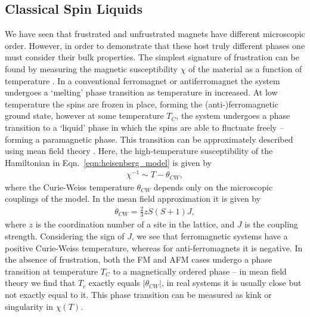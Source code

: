 
\subsection{Classical Spin Liquids} 

We have seen that frustrated and unfrustrated magnets have different microscopic order. However, in order to demonstrate that these host truly different phases one must consider their bulk properties. The simplest signature of frustration can be found by measuring the magnetic susceptibility $\chi$ of the material as a function of temperature \cite{ramirez_strongly_1994,mugiraneza_tutorial_2022}. In a conventional ferromagnet or antiferromagnet the system undergoes a `melting' phase transition as temperature in increased. At low temperature the spins are frozen in place, forming the (anti-)ferromagnetic ground state, however at some temperature $T_C$, the system undergoes a phase transition to a `liquid' phase in which the spins are able to fluctuate freely -- forming a paramagnetic phase. This transition can be approximately described using mean field theory \cite{simon_oxford_2013}. Here, the high-temperature susceptibility of the Hamiltonian in Eqn.~\ref{eqn:heisenberg_model} is given by
\begin{align}
    \chi^{-1} \sim T - \theta_{CW},
\end{align}
where the Curie-Weiss temperature $\theta_{CW}$ depends only on the microscopic couplings of the model. In the mean field approximation it is given by
\begin{align}
    \theta_{CW} = \frac 23 z S(S+1 ) J,
\end{align} 
where $z$ is the coordination number of a site in the lattice, and $J$ is the coupling strength. Considering the sign of $J$, we see that ferromagnetic systems have a positive Curie-Weiss temperature, whereas for anti-ferromagnets it is negative. In the absence of frustration, both the FM and AFM cases undergo a phase transition at temperature $T_C$ to a magnetically ordered phase --  in mean field theory we find that $T_c$ exactly equals $|\theta_{CW}|$, in real systems it is usually close but not exactly equal to it. This phase transition can be measured as kink or singularity in $\chi(T)$.

